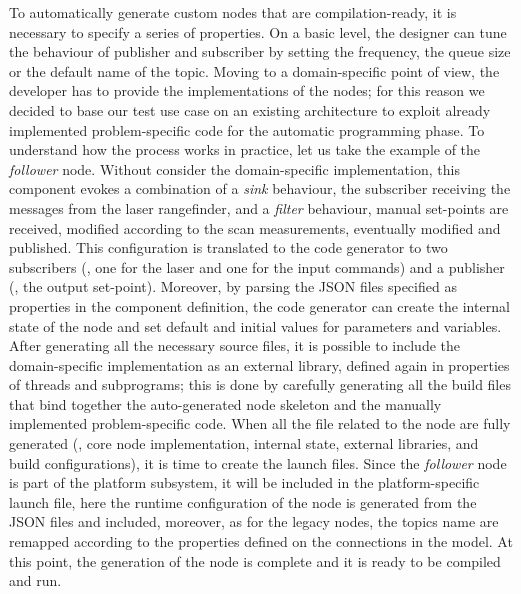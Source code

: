 To automatically generate custom nodes that are compilation-ready, it is necessary to specify a series of properties. On a basic level, the designer can tune the behaviour of publisher and subscriber by setting the frequency, the queue size or the default name of the topic. Moving to a domain-specific point of view, the developer has to provide the implementations of the nodes; for this reason we decided to base our test use case on an existing architecture to exploit already implemented problem-specific code for the automatic programming phase. To understand how the process works in practice, let us take the example of the \textit{follower} node. Without consider the domain-specific implementation, this component evokes a combination of a \textit{sink} behaviour, the subscriber receiving the messages from the laser rangefinder, and a \textit{filter} behaviour, manual set-points are received, modified according to the scan measurements, eventually modified and published. This configuration is translated to the code generator to two subscribers (\ie, one for the laser and one for the input commands) and a publisher (\ie, the output set-point). Moreover, by parsing the JSON files specified as properties in the component definition, the code generator can create the internal state of the node and set default and initial values for parameters and variables. After generating all the necessary source files, it is possible to include the domain-specific implementation as an external library, defined again in properties of threads and subprograms; this is done by carefully generating all the build files that bind together the auto-generated node skeleton and the manually implemented problem-specific code. When all the file related to the node are fully generated (\ie, core node implementation, internal state, external libraries, and build configurations), it is time to create the launch files. Since the \textit{follower} node is part of the platform subsystem, it will be included in the platform-specific launch file, here the runtime configuration of the node is generated from the JSON files and included, moreover, as for the legacy nodes, the topics name are remapped according to the properties defined on the connections in the model. At this point, the generation of the node is complete and it is ready to be compiled and run.

